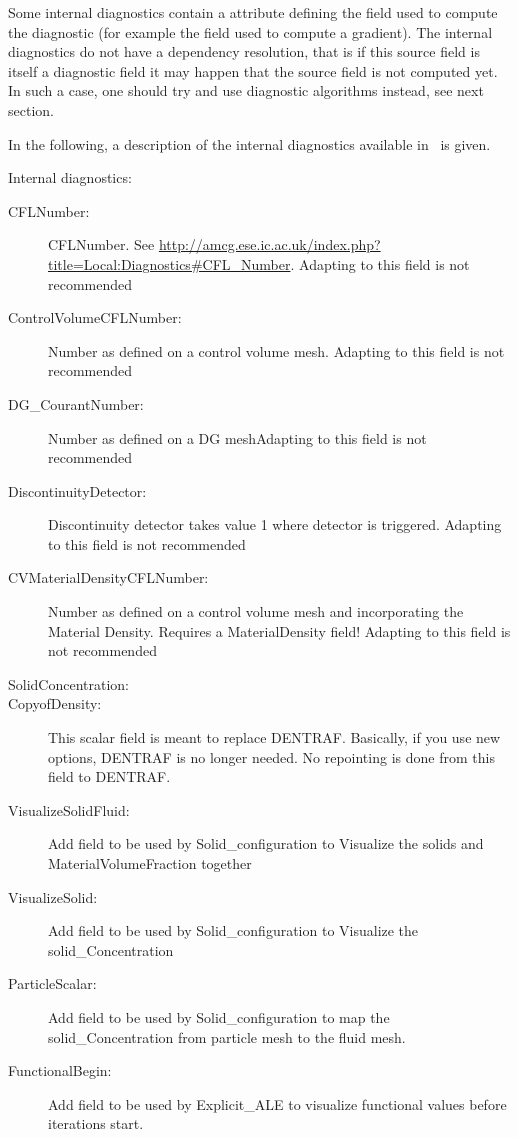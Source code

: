 Some internal diagnostics contain a 
attribute defining the field used to compute the diagnostic (for example the
field used to compute a gradient). The internal diagnostics do not have a dependency resolution, that is if this source field is itself a diagnostic
field it may happen that the source field is not computed yet. In such a case, one should try and use diagnostic algorithms instead, see next section.

In the following, a description of the internal diagnostics available in \fluidity\ is given. 

Internal  diagnostics:

\begin{description}
\item[CFLNumber:]CFLNumber. See \url{http://amcg.ese.ic.ac.uk/index.php?title=Local:Diagnostics\#CFL\_Number}.
	Adapting to this field is not recommended  
\item[ControlVolumeCFLNumber:]Number as defined on a control volume mesh. Adapting to this field is not recommended  
\item[DG\_CourantNumber:]Number as defined on a DG meshAdapting to this field is not recommended  
\item[DiscontinuityDetector:]Discontinuity detector takes value 1 where detector is triggered.
	Adapting to this field is not recommended  
\item[CVMaterialDensityCFLNumber:]Number as defined on a control volume mesh and incorporating the Material Density. Requires a MaterialDensity field!
Adapting to this field is not recommended  
\item[SolidConcentration:]  
\item[CopyofDensity:]This scalar field is meant to replace DENTRAF. Basically, if you use new options, DENTRAF is no longer needed. No repointing is done from this field to DENTRAF.  
\item[VisualizeSolidFluid:]Add field to be used by Solid\_configuration to Visualize the solids and MaterialVolumeFraction together  
\item[VisualizeSolid:]Add field to be used by Solid\_configuration to Visualize the solid\_Concentration  
\item[ParticleScalar:]Add field to be used by Solid\_configuration to map  the solid\_Concentration from particle mesh to the fluid mesh.  
\item[FunctionalBegin:]Add field to be used by Explicit\_ALE to visualize functional values before iterations start.  

\end{description}

